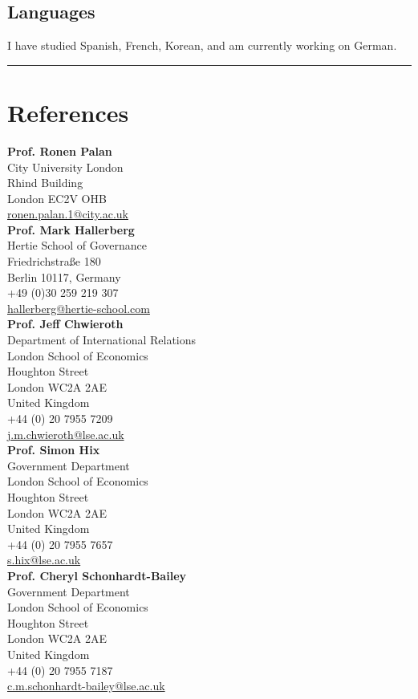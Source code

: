 \documentclass[a4paper]{article}
\begin{document}
\subsection*{Languages}

I have studied Spanish, French, Korean, and am currently working on German.


\vspace{0.5cm}
\medskip\hrule height 1pt
\vspace{0.5cm}

\section*{References}

\noindent \textbf{Prof. Ronen Palan} \\
City University London\\
Rhind Building\\
London EC2V OHB \\
\href{mailto:ronen.palan.1@city.ac.uk}{ronen.palan.1@city.ac.uk}\\

\noindent \textbf{Prof. Mark Hallerberg} \\
Hertie School of Governance\\
Friedrichstra{\ss}e 180\\
Berlin 10117, Germany \\
+49 (0)30 259 219 307 \\
\href{mailto:hallerberg@hertie-school.com}{hallerberg@hertie-school.com}\\

\noindent \textbf{Prof. Jeff Chwieroth}\\
Department of International Relations \\
London School of Economics \\
Houghton Street \\
London WC2A 2AE \\
United Kingdom\\
+44 (0) 20 7955 7209\\
\href{mailto:j.m.chwieroth@lse.ac.uk}{j.m.chwieroth@lse.ac.uk}\\

\noindent \textbf{Prof. Simon Hix}\\
Government Department \\
London School of Economics \\
Houghton Street \\
London WC2A 2AE \\
United Kingdom\\
+44 (0) 20 7955 7657\\
\href{mailto:s.hix@lse.ac.uk}{s.hix@lse.ac.uk}\\

\noindent \textbf{Prof. Cheryl Schonhardt-Bailey}\\
Government Department \\
London School of Economics \\
Houghton Street \\
London WC2A 2AE \\
United Kingdom\\
+44 (0) 20 7955 7187\\
\href{mailto:c.m.schonhardt-bailey@lse.ac.uk}{c.m.schonhardt-bailey@lse.ac.uk}\\
\end{document}
